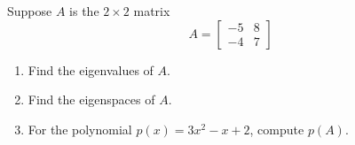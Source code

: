 Suppose $A$ is the $2\times 2$ matrix
%
\begin{equation*}
A=\begin{bmatrix}
-5 & 8\\-4 & 7
\end{bmatrix}
\end{equation*}
%
\begin{enumerate}
%
\item Find the eigenvalues of $A$.
%
\item Find the eigenspaces of $A$.
%
\item For the polynomial $p(x)=3x^2-x+2$, compute $p(A)$.
%
\end{enumerate}